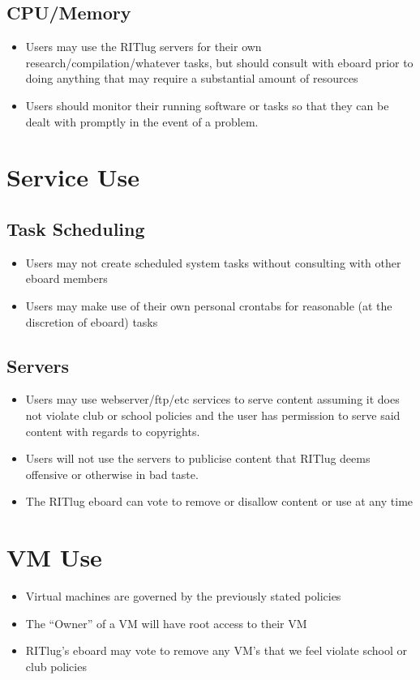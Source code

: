 \subsection{CPU/Memory}
\begin{itemize}
\item Users may use the RITlug servers for their own research/compilation/whatever tasks, but should consult with eboard prior to doing anything that may require a substantial amount of resources
\item Users should monitor their running software or tasks so that they can be dealt with promptly in the event of a problem.
\end{itemize}

\section{Service Use}

\subsection{Task Scheduling}
\begin{itemize}
\item Users may not create scheduled system tasks without consulting with other eboard members
\item Users may make use of their own personal crontabs for reasonable (at the discretion of eboard) tasks
\end{itemize}

\subsection{Servers}
\begin{itemize}
\item Users may use webserver/ftp/etc services to serve content assuming it does not violate club or school policies and the user has permission to serve said content with regards to copyrights.
\item Users will not use the servers to publicise content that RITlug deems offensive or otherwise in bad taste.
\item The RITlug eboard can vote to remove or disallow content or use at any time
\end{itemize}

\section{VM Use}
\begin{itemize}
\item Virtual machines are governed by the previously stated policies
\item The “Owner” of a VM will have root access to their VM
\item RITlug’s eboard may vote to remove any VM’s that we feel violate school or club policies
\end{itemize}

